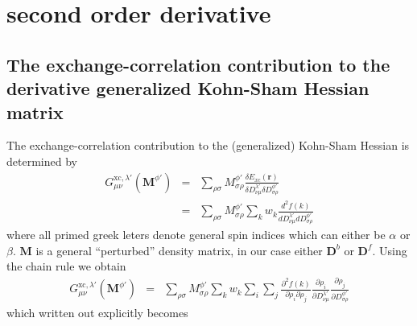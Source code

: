 \documentclass[preprint,preprintnumbers,amsmath,amssymb,11pt]{revtex4}
\def\xc{\textrm{xc}}
\begin{document}
\section{second order derivative}
\subsection{The exchange-correlation contribution to the derivative generalized Kohn-Sham Hessian matrix}

The exchange-correlation contribution to the (generalized) Kohn-Sham Hessian is determined by~\cite{Thomas_QRRSP}
\begin{eqnarray}
\label{GdefinitionTK}
G^{\xc,\lambda'}_{\mu \nu}( \textbf{M}^{\phi'} ) &=& \sum_{\rho \sigma} M^{\phi'}_{ \sigma \rho} \frac{\delta E_{xc}(\textbf{r})}{\delta D^{\lambda'}_{\nu \mu} \delta D^{\phi'}_{\sigma \rho} }\\
&=& \sum_{\rho \sigma} M^{\phi'}_{ \sigma \rho}\sum_{k}w_{k} \frac{d^{2} f(k)}{d D^{\lambda'}_{\nu \mu} d D^{\phi'}_{\sigma \rho}} 
\end{eqnarray}
where all primed greek leters denote general spin indices which can either be $\alpha$ or $\beta$. $\textbf{M}$ is a general ``perturbed'' density matrix, in our case either  $\textbf{D}^{b}$ or  $\textbf{D}^{f}$. Using the chain rule we obtain
\begin{eqnarray}
G^{\xc,\lambda'}_{\mu \nu}( \textbf{M}^{\phi'} ) &=& \sum_{\rho \sigma} M^{\phi'}_{ \sigma \rho}\sum_{k}w_{k}\sum_{i}\sum_{j} \frac{\partial^{2} f(k)}{\partial \rho_{i} \partial \rho_{j}} \frac{\partial \rho_{i}}{\partial D^{\lambda'}_{\nu \mu}} \frac{\partial \rho_{j}}{\partial  D^{\phi'}_{\sigma \rho}} 
\end{eqnarray}
which written out explicitly becomes
\end{document}
